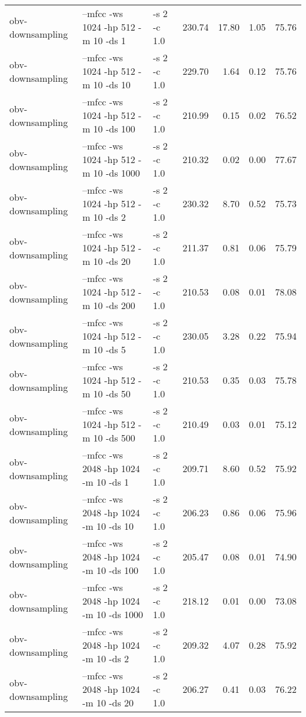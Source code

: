 \documentclass[11pt,a4paper]{article}
\begin{document}
\begin{tabular}{lllrrrr}
 obv-downsampling  &  --mfcc -ws 1024 -hp 512 -m 10 -ds 1      &  -s 2 -c 1.0  &  230.74  &  17.80  &  1.05  &  75.76  \\
 obv-downsampling  &  --mfcc -ws 1024 -hp 512 -m 10 -ds 10     &  -s 2 -c 1.0  &  229.70  &   1.64  &  0.12  &  75.76  \\
 obv-downsampling  &  --mfcc -ws 1024 -hp 512 -m 10 -ds 100    &  -s 2 -c 1.0  &  210.99  &   0.15  &  0.02  &  76.52  \\
 obv-downsampling  &  --mfcc -ws 1024 -hp 512 -m 10 -ds 1000   &  -s 2 -c 1.0  &  210.32  &   0.02  &  0.00  &  77.67  \\
 obv-downsampling  &  --mfcc -ws 1024 -hp 512 -m 10 -ds 2      &  -s 2 -c 1.0  &  230.32  &   8.70  &  0.52  &  75.73  \\
 obv-downsampling  &  --mfcc -ws 1024 -hp 512 -m 10 -ds 20     &  -s 2 -c 1.0  &  211.37  &   0.81  &  0.06  &  75.79  \\
 obv-downsampling  &  --mfcc -ws 1024 -hp 512 -m 10 -ds 200    &  -s 2 -c 1.0  &  210.53  &   0.08  &  0.01  &  78.08  \\
 obv-downsampling  &  --mfcc -ws 1024 -hp 512 -m 10 -ds 5      &  -s 2 -c 1.0  &  230.05  &   3.28  &  0.22  &  75.94  \\
 obv-downsampling  &  --mfcc -ws 1024 -hp 512 -m 10 -ds 50     &  -s 2 -c 1.0  &  210.53  &   0.35  &  0.03  &  75.78  \\
 obv-downsampling  &  --mfcc -ws 1024 -hp 512 -m 10 -ds 500    &  -s 2 -c 1.0  &  210.49  &   0.03  &  0.01  &  75.12  \\
 obv-downsampling  &  --mfcc -ws 2048 -hp 1024 -m 10 -ds 1     &  -s 2 -c 1.0  &  209.71  &   8.60  &  0.52  &  75.92  \\
 obv-downsampling  &  --mfcc -ws 2048 -hp 1024 -m 10 -ds 10    &  -s 2 -c 1.0  &  206.23  &   0.86  &  0.06  &  75.96  \\
 obv-downsampling  &  --mfcc -ws 2048 -hp 1024 -m 10 -ds 100   &  -s 2 -c 1.0  &  205.47  &   0.08  &  0.01  &  74.90  \\
 obv-downsampling  &  --mfcc -ws 2048 -hp 1024 -m 10 -ds 1000  &  -s 2 -c 1.0  &  218.12  &   0.01  &  0.00  &  73.08  \\
 obv-downsampling  &  --mfcc -ws 2048 -hp 1024 -m 10 -ds 2     &  -s 2 -c 1.0  &  209.32  &   4.07  &  0.28  &  75.92  \\
 obv-downsampling  &  --mfcc -ws 2048 -hp 1024 -m 10 -ds 20    &  -s 2 -c 1.0  &  206.27  &   0.41  &  0.03  &  76.22  \\

\end{tabular}
\end{document}
